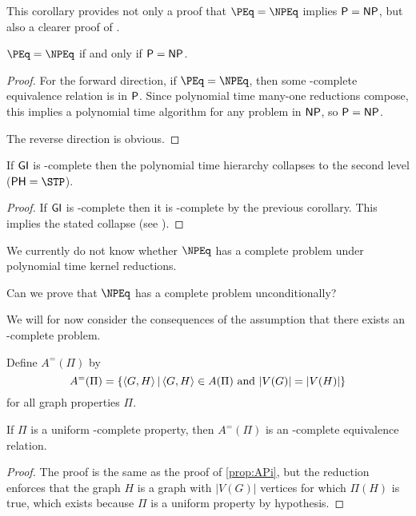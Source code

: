 This corollary provides not only a proof that $\PEq=\NPEq$ implies $\P=\NP$, but also a clearer proof of \cite[Proposition~8.1]{bcffm}.

\begin{corollary}
  $\PEq=\NPEq$ if and only if $\P=\NP$.
\end{corollary}
\begin{proof}
  For the forward direction, if $\PEq=\NPEq$, then some \NP-complete equivalence relation is in $\P$.
  Since polynomial time many-one reductions compose, this implies a polynomial time algorithm for any problem in $\NP$, so $\P=\NP$.

  The reverse direction is obvious.
\end{proof}

\begin{proposition}
  If $\GI$ is \NPEq-complete then the polynomial time hierarchy collapses to the second level ($\PH=\STP$).
\end{proposition}
\begin{proof}
  If $\GI$ is \NPEq-complete then it is \NP-complete by the previous corollary.
  This implies the stated collapse (see \cite{schoning87}).
\end{proof}

We currently do not know whether $\NPEq$ has a complete problem under polynomial time kernel reductions.
\begin{openproblem}
  Can we prove that $\NPEq$ has a complete problem unconditionally?
\end{openproblem}

We will for now consider the consequences of the assumption that there exists an \NPEq-complete problem.

Define $A^=(\Pi)$ by
\begin{displaymath}
  A^=(\Pi) = \lb \pair{G}{H} \st \pair{G}{H}\in A(\Pi) \plain{and} |V(G)|=|V(H)|\rb
\end{displaymath}
for all graph properties $\Pi$.

\begin{proposition}\label{prop:APieq}
  If $\Pi$ is a uniform \NP-complete property, then $A^=(\Pi)$ is an \NP-complete equivalence relation.
\end{proposition}
\begin{proof}
  The proof is the same as the proof of \autoref{prop:APi}, but the reduction enforces that the graph $H$ is a graph with $|V(G)|$ vertices for which $\Pi(H)$ is true, which exists because $\Pi$ is a uniform property by hypothesis.
\end{proof}

